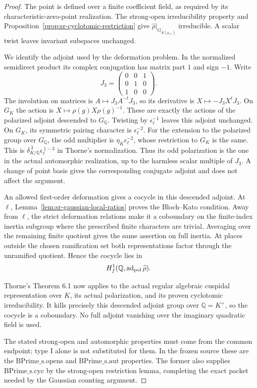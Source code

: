 \begin{proof}
The point is defined over a finite coefficient field,
as required by its characteristic-zero-point realization.
The strong-open irreducibility property and
Proposition~\ref{prop:sr-cyclotomic-restriction} give
\(\widehat\rho|_{G_{K(\mu_{\ell^\infty})}}\) irreducible.
A scalar twist leaves invariant subspaces unchanged.

We identify the adjoint used by the deformation problem.
In the normalized semidirect product its complex
conjugation has matrix part \(1\) and sign \(-1\).
Write
\[
 J_3=\begin{pmatrix}0&0&1\\0&1&0\\1&0&0\end{pmatrix}.
\]
The involution on matrices is
\(A\mapsto J_3 A^{-t}J_3\), so its derivative is
\(X\mapsto-J_3X^tJ_3\).
On \(G_K\) the action is \(X\mapsto\rho(g)X\rho(g)^{-1}\).
These are exactly the actions of the polarized adjoint
descended to \(G_{\mathbb Q}\).
Twisting by \(\epsilon_\ell^{-1}\) leaves this adjoint
unchanged.
On \(G_K\), its symmetric pairing character is
\(\epsilon_\ell^{-2}\).
For the extension to the polarized group over
\(G_{\mathbb Q}\), the odd multiplier is
\(\eta_K\epsilon_\ell^{-2}\), whose restriction to \(G_K\)
is the same. This is
\(\delta_{K/\mathbb Q}^{\,3}\epsilon_\ell^{\,1-3}\)
in Thorne's normalization.
Thus its odd polarization is the one in the actual
automorphic realization, up to the harmless scalar multiple
of \(J_3\). A change of point basis gives the corresponding
conjugate adjoint and does not affect the argument.

An allowed first-order deformation gives a cocycle in this
descended adjoint.
At \(\ell\), Lemma~\ref{lem:sr-gaussian-local-ratios}
proves the Bloch--Kato condition.
Away from \(\ell\), the strict deformation relations make
it a coboundary on the finite-index inertia subgroup where
the prescribed finite characters are trivial.
Averaging over the remaining finite quotient gives the
same assertion on full inertia.
At places outside the chosen ramification set both
representations factor through the unramified quotient.
Hence the cocycle lies in
\[
 H^1_f(\mathbb Q,\operatorname{ad}_{\rm pol}\widehat\rho).
\]

Thorne's Theorem 6.1 now applies to the actual regular
algebraic cuspidal representation over \(K\), its actual
polarization, and its proven cyclotomic irreducibility.
It kills precisely this descended adjoint group over
\(\mathbb Q=K^+\), so the cocycle is a coboundary.
No full adjoint vanishing over the imaginary quadratic
field is used.

The stated strong-open and automorphic properties must come
from the common endpoint; type I alone is not substituted
for them. In the frozen source these are the
\(\mathrm{BPrime\_s.opens}\) and
\(\mathrm{BPrime\_s.aut}\) properties.
The former also supplies \(\mathrm{BPrime\_s.cyc}\) by the
strong-open restriction lemma, completing the exact packet
needed by the Gaussian counting argument.
\end{proof}

